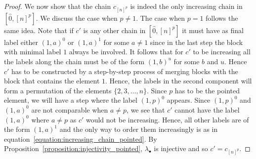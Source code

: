 \begin{proof}
We now show that the chain $c_{[n]^p}$ is indeed the only increasing chain in $[\hat{0},[n]^p]$. We discuss the case when $p\neq 1$. The case when $p=1$ follows the same idea. Note that if $c'$ is any other chain in $[\hat{0},[n]^p]$ it must have as final label either $(1,a)^0$ or $(1,a)^1$ for some $a\neq 1$ since in the last step the block with minimal label $1$ always be involved.  It follows that for $c'$ to be increasing all the labels along the chain must be of the form $(1,b)^u$ for some $b$ and $u$.  Hence $c'$ has to be constructed by a step-by-step process of merging blocks with the block that contains the element $1$. Hence, the labels in the second component will form a permutation  of the elements $\{2,3,\dots, n\}$. Since $p$ has to be the pointed element, we will have a step where the label $(1,p)^0$ appears. Since  $(1,p)^0$ and $(1,a)^0$ are not comparable when $a\neq p$, we see that $c'$ cannot have the label $(1,a)^0$ where $a\neq p$ as $c'$ would not be increasing.  Hence, all other labels are of the form  $(1,a)^1$ and the only way to order them increasingly is as in equation~\eqref{equation:increasing_chain_pointed}. By Proposition~\ref{proposition:injectivity_pointed}, $\lambda_{\bullet}$ is injective and so $c'=c_{[n]^p}$.




\end{proof}
